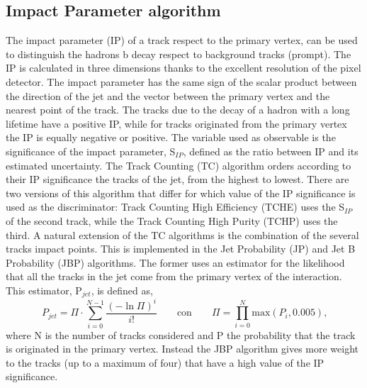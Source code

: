 \subsection*{Impact Parameter algorithm}
The impact parameter (IP) of a track respect to the primary vertex, can be used to distinguish 
the hadrons b decay  respect to background tracks (prompt). The IP is calculated in three dimensions 
thanks to the excellent resolution of the pixel detector.
The impact parameter has the same sign of the scalar product between the direction of the
jet and the vector between the primary vertex and the nearest point of the track. The tracks
due to the decay of a hadron with a long lifetime
have a positive IP, while for tracks originated from the primary vertex
the IP is equally negative or positive.
The variable used as observable is the significance of the impact parameter, 
S$_{IP}$, defined as the ratio between IP and its estimated uncertainty.
The Track Counting (TC) algorithm orders according to their IP significance
the tracks of the jet, from the highest to lowest. There are two versions of this algorithm that
differ for which value of the IP significance is used as the discriminator:
Track Counting High Efficiency (TCHE) uses the S$_{IP}$ of the second track, while the Track Counting High Purity (TCHP) uses the third.
A natural extension of the TC algorithms is the combination of the several tracks impact points. 
This is implemented in the Jet Probability (JP) and Jet
B Probability (JBP) algorithms. The former uses an estimator for the likelihood that 
all the tracks in the jet come
from the primary vertex of the interaction. This estimator, P$_{jet}$, is defined as,
\begin{equation}
P_{jet}=\Pi \cdot \sum_{i=0} ^{N-1} \frac{(-\ln \Pi)^i}{i!} \qquad \mbox{con} \qquad \Pi= \prod_{i=0} ^{N}\mbox{max}(P_i, 0.005)  \mbox{,}\end{equation} 
where N is the number of tracks considered and P  the probability that the track is
originated in the primary vertex.
Instead the JBP algorithm gives more weight to the tracks (up to a maximum of four) that have a high 
value of the IP significance. 

